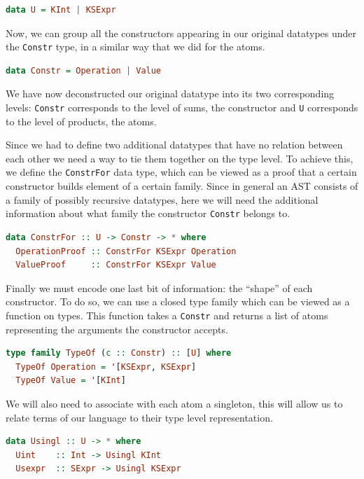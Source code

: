 \documentclass[11pt]{article}
\begin{document}
\begin{lstlisting}[language=haskell]
data U = KInt | KSExpr 
\end{lstlisting}

Now, we can group all the constructors appearing in our original
datatypes under the \texttt{Constr} type, in a similar way that we
did for the atoms. 

\begin{lstlisting}[language=haskell]
data Constr = Operation | Value
\end{lstlisting}

We have now deconstructed our original datatype into its two corresponding 
levels: \texttt{Constr} corresponds to the level of sums, the constructor and 
\texttt{U} corresponds to the level of products, the atoms.

Since we had to define two additional datatypes that have no relation between 
each other we need a way to tie them together on the type level.
To achieve this, we define the \texttt{ConstrFor} data type,
which can be viewed as a proof that a certain constructor builds element
of a certain family. Since in general an AST consists of a family of possibly 
recursive datatypes, here we will need the additional information about what 
family the constructor \texttt{Constr} belongs to.

\begin{lstlisting}[language=haskell]
data ConstrFor :: U -> Constr -> * where
  OperationProof :: ConstrFor KSExpr Operation
  ValueProof     :: ConstrFor KSExpr Value
\end{lstlisting}

Finally we must encode one last bit of information: the ``shape'' of
each constructor. To do so, we can use a closed type family which can be
viewed as a function on types. This function takes a \texttt{Constr} and
returns a list of atoms representing the arguments the constructor
accepts.

\begin{lstlisting}[language=haskell]
type family TypeOf (c :: Constr) :: [U] where
  TypeOf Operation = '[KSExpr, KSExpr]
  TypeOf Value = '[KInt]
\end{lstlisting}

We will also need to associate with each atom a singleton, this will
allow us to relate terms of our language to their type level representation. 

\begin{lstlisting}[language=haskell]
data Usingl :: U -> * where
  Uint    :: Int -> Usingl KInt
  Usexpr  :: SExpr -> Usingl KSExpr
\end{lstlisting}
\end{document}
